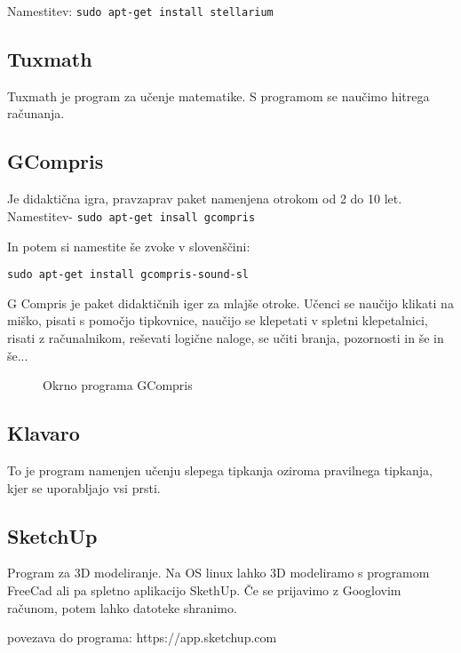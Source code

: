 \documentclass[12pt,a4paper,twoside]{article}
\begin{document}
Namestitev: \texttt{sudo apt-get install stellarium }

\subsection{Tuxmath}
Tuxmath je program za učenje matematike. S programom se naučimo hitrega računanja. 


\subsection{GCompris}
Je didaktična igra, pravzaprav paket namenjena otrokom od 2 do 10 let. 
Namestitev-
      \texttt{sudo apt-get insall gcompris}
      
In potem si namestite še zvoke v slovenščini:

    \texttt{sudo apt-get install gcompris-sound-sl}

G Compris je paket didaktičnih iger za mlajše otroke. Učenci se naučijo klikati na miško, pisati s pomočjo tipkovnice, naučijo se klepetati v spletni klepetalnici, risati z računalnikom, reševati logične naloge, se učiti branja, pozornosti in še in še...

\begin{figure}[h!] \centering
{}
\caption{Okrno programa GCompris}
\label{slika:Okno programa GCompris}
\end{figure}


\subsection{Klavaro}
To je program namenjen učenju slepega tipkanja oziroma pravilnega tipkanja, kjer se uporabljajo vsi prsti. 

\subsection{SketchUp}
Program za 3D modeliranje. Na OS linux lahko 3D modeliramo s programom FreeCad ali pa spletno aplikacijo SkethUp. Če se prijavimo z Googlovim računom, potem lahko datoteke shranimo.

povezava do programa: https://app.sketchup.com
\end{document}
